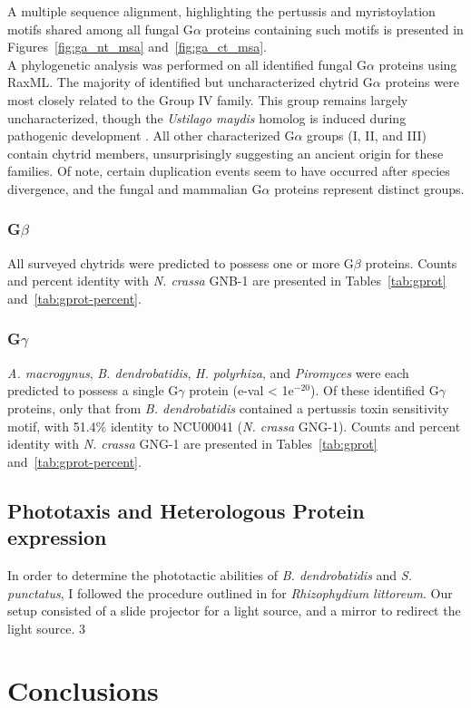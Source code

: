 \indent A multiple sequence alignment, highlighting the pertussis and myristoylation motifs shared among all fungal G$\alpha$ proteins containing such motifs is presented in Figures~\ref{fig:ga_nt_msa} and~\ref{fig:ga_ct_msa}.\\
\indent A phylogenetic analysis was performed on all identified fungal G$\alpha$ proteins using RaxML. The majority of identified but uncharacterized chytrid G$\alpha$ proteins were most closely related to the Group IV family. This group remains largely uncharacterized, though the \textit{Ustilago maydis} homolog is induced during pathogenic development \cite{Bolker1998}. All other characterized G$\alpha$ groups (I, II, and III) contain chytrid members, unsurprisingly suggesting an ancient origin for these families. Of note, certain duplication events seem to have occurred after species divergence, and the fungal and mammalian G$\alpha$ proteins represent distinct groups.\\
\subsubsection{G$\beta$}
All surveyed chytrids were predicted to possess one or more G$\beta$ proteins. Counts and percent identity with \textit{N. crassa} GNB-1 are presented in Tables~\ref{tab:gprot} and~\ref{tab:gprot-percent}.
\subsubsection{G$\gamma$}
\textit{A. macrogynus}, \textit{B. dendrobatidis}, \textit{H. polyrhiza}, and \textit{Piromyces} were each predicted to possess a single G$\gamma$ protein (e-val < 1e$^{-20}$). Of these identified G$\gamma$ proteins, only that from \textit{B. dendrobatidis} contained a pertussis toxin sensitivity motif, with 51.4\% identity to NCU00041 (\textit{N. crassa} GNG-1). Counts and percent identity with \textit{N. crassa} GNG-1 are presented in Tables~\ref{tab:gprot} and~\ref{tab:gprot-percent}.
\subsection{Phototaxis and Heterologous Protein expression}
In order to determine the phototactic abilities of \textit{B. dendrobatidis} and \textit{S. punctatus}, I followed the procedure outlined in \cite{Muhelstein} for \textit{Rhizophydium littoreum}. Our setup consisted of a slide projector for a light source, and a mirror to redirect the light source. 3
\section{Conclusions}
